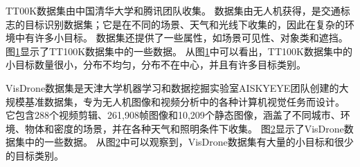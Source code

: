 TT00K数据集由中国清华大学和腾讯团队收集。
数据集由无人机获得，是交通标志的目标识别数据集；它是在不同的场景、天气和光线下收集的，因此在复杂的环境中有许多小目标。
数据集还提供了一些属性，如场景可见性、对象类和遮挡。
图\ref{fig:tt100k_figure}显示了TT100K数据集中的一些数据。
从图\ref{fig:tt100k_figure}中可以看出，TT100K数据集中的小目标数量很小，分布不均匀，分布不在中心，并且有许多目标类别。

\begin{figure}[htbp]
    \centering
    \captionsetup{font=footnotesize}
    \label{fig:tt100k_figure}
\end{figure}

VisDrone数据集是天津大学机器学习和数据挖掘实验室AISKYEYE团队创建的大规模基准数据集，专为无人机图像和视频分析中的各种计算机视觉任务而设计。
它包含288个视频剪辑、261,908帧图像和10,209个静态图像，涵盖了不同城市、环境、物体和密度的场景，并在各种天气和照明条件下收集。
图\ref{fig:vd_figure}显示了VisDrone数据集中的一些数据。
从图\ref{fig:vd_figure}中可以观察到，VisDrone数据集有大量的小目标和很少的目标类别。

\begin{figure}[htbp]
    \centering
    \captionsetup{font=footnotesize}
    \label{fig:vd_figure}
\end{figure}

